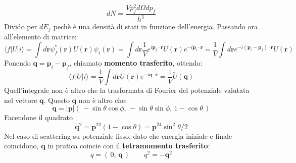 \begin{equation*}
    dN=\frac{Vp_f^2d\Omega dp_f}{h^3}
\end{equation*}
Divido per $dE_f$ pechè è una densità di stati in funzione dell'energia.
Passando ora all'elemento di matrice:
\begin{equation*}
    \langle f|U|i\rangle=\int d\mathbf{r}\psi^*_f(\mathbf{r})U(\mathbf{r})\psi_i(\mathbf{r})=\int d\mathbf{r}\frac{1}{V}e^{i\mathbf{p}_f\cdot\mathbf{r}}U(\mathbf{r})e^{-i\mathbf{p}_i\cdot\mathbf{r}}=\frac{1}{V}\int d\mathbf{r}e^{-i(\mathbf{p}_i-\mathbf{p}_f)\cdot\mathbf{r}}U(\mathbf{r})
\end{equation*}
Ponendo $\mathbf{q}=\mathbf{p}_i-\mathbf{p}_f$, chiamato\textbf{ momento trasferito}, ottendo:
\begin{equation*}
    \langle f|U|i\rangle=\frac{1}{V}\int d\mathbf{r}U(\mathbf{r})e^{-i\mathbf{q}\cdot\mathbf{r}}=\frac{1}{V}\tilde{U}(\mathbf{q})
\end{equation*}
Quell'integrale non è altro che la trasformata di Fourier del potenziale valutata nel vettore $\mathbf{q}$. Questo $\mathbf{q}$ non è altro che:
\begin{equation*}
    \mathbf{q}=|\mathbf{p}|\left(\,-\sin\theta\cos\phi,\,-\sin\theta\sin\phi,\,1-\cos\theta\,\right)
\end{equation*}
Facendone il quadrato
\begin{equation*}
    \mathbf{q}^2=\mathbf{p}^22(1-\cos\theta)=\mathbf{p}^24\sin^2\theta/2
\end{equation*}
Nel caso di scattering su potenziale fisso, dato che energia iniziale e finale coincidono, $\mathbf{q}$ in pratica coincie con il \textbf{tetramomento trasferito}:
\begin{equation*}
    q=\left(\,0,\,\mathbf{q}\,\right) \qquad q^2=-\mathbf{q}^2
\end{equation*}

